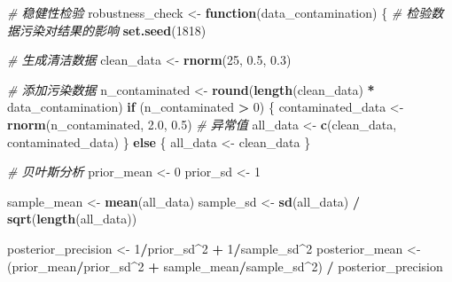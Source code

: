 \documentclass[
]{book}
\newenvironment{Shaded}{\begin{snugshade}}{\end{snugshade}}
\newcommand{\CommentTok}[1]{\textcolor[rgb]{0.56,0.35,0.01}{\textit{#1}}}
\newcommand{\ControlFlowTok}[1]{\textcolor[rgb]{0.13,0.29,0.53}{\textbf{#1}}}
\newcommand{\DecValTok}[1]{\textcolor[rgb]{0.00,0.00,0.81}{#1}}
\newcommand{\FloatTok}[1]{\textcolor[rgb]{0.00,0.00,0.81}{#1}}
\newcommand{\FunctionTok}[1]{\textcolor[rgb]{0.13,0.29,0.53}{\textbf{#1}}}
\newcommand{\NormalTok}[1]{#1}
\newcommand{\OtherTok}[1]{\textcolor[rgb]{0.56,0.35,0.01}{#1}}
\newcommand{\SpecialCharTok}[1]{\textcolor[rgb]{0.81,0.36,0.00}{\textbf{#1}}}
\begin{document}
\begin{Shaded}
\begin{Highlighting}[]
\CommentTok{\# 稳健性检验}
\NormalTok{robustness\_check }\OtherTok{\textless{}{-}} \ControlFlowTok{function}\NormalTok{(data\_contamination) \{}
  \CommentTok{\# 检验数据污染对结果的影响}
  \FunctionTok{set.seed}\NormalTok{(}\DecValTok{1818}\NormalTok{)}

  \CommentTok{\# 生成清洁数据}
\NormalTok{  clean\_data }\OtherTok{\textless{}{-}} \FunctionTok{rnorm}\NormalTok{(}\DecValTok{25}\NormalTok{, }\FloatTok{0.5}\NormalTok{, }\FloatTok{0.3}\NormalTok{)}

  \CommentTok{\# 添加污染数据}
\NormalTok{  n\_contaminated }\OtherTok{\textless{}{-}} \FunctionTok{round}\NormalTok{(}\FunctionTok{length}\NormalTok{(clean\_data) }\SpecialCharTok{*}\NormalTok{ data\_contamination)}
  \ControlFlowTok{if}\NormalTok{ (n\_contaminated }\SpecialCharTok{\textgreater{}} \DecValTok{0}\NormalTok{) \{}
\NormalTok{    contaminated\_data }\OtherTok{\textless{}{-}} \FunctionTok{rnorm}\NormalTok{(n\_contaminated, }\FloatTok{2.0}\NormalTok{, }\FloatTok{0.5}\NormalTok{)  }\CommentTok{\# 异常值}
\NormalTok{    all\_data }\OtherTok{\textless{}{-}} \FunctionTok{c}\NormalTok{(clean\_data, contaminated\_data)}
\NormalTok{  \} }\ControlFlowTok{else}\NormalTok{ \{}
\NormalTok{    all\_data }\OtherTok{\textless{}{-}}\NormalTok{ clean\_data}
\NormalTok{  \}}

  \CommentTok{\# 贝叶斯分析}
\NormalTok{  prior\_mean }\OtherTok{\textless{}{-}} \DecValTok{0}
\NormalTok{  prior\_sd }\OtherTok{\textless{}{-}} \DecValTok{1}

\NormalTok{  sample\_mean }\OtherTok{\textless{}{-}} \FunctionTok{mean}\NormalTok{(all\_data)}
\NormalTok{  sample\_sd }\OtherTok{\textless{}{-}} \FunctionTok{sd}\NormalTok{(all\_data) }\SpecialCharTok{/} \FunctionTok{sqrt}\NormalTok{(}\FunctionTok{length}\NormalTok{(all\_data))}

\NormalTok{  posterior\_precision }\OtherTok{\textless{}{-}} \DecValTok{1}\SpecialCharTok{/}\NormalTok{prior\_sd}\SpecialCharTok{\^{}}\DecValTok{2} \SpecialCharTok{+} \DecValTok{1}\SpecialCharTok{/}\NormalTok{sample\_sd}\SpecialCharTok{\^{}}\DecValTok{2}
\NormalTok{  posterior\_mean }\OtherTok{\textless{}{-}}\NormalTok{ (prior\_mean}\SpecialCharTok{/}\NormalTok{prior\_sd}\SpecialCharTok{\^{}}\DecValTok{2} \SpecialCharTok{+}\NormalTok{ sample\_mean}\SpecialCharTok{/}\NormalTok{sample\_sd}\SpecialCharTok{\^{}}\DecValTok{2}\NormalTok{) }\SpecialCharTok{/}\NormalTok{ posterior\_precision}


\end{Highlighting}
\end{Shaded}
\end{document}
